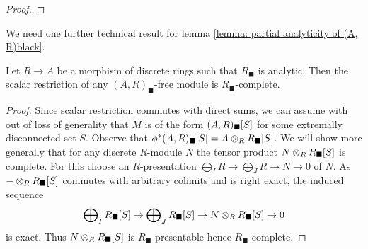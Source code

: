 \begin{proof}
\end{proof}

We need one further technical result for lemma \ref{lemma: partial analyticity of (A, R)black}.
\begin{lemma}
	\label{lemma: relative completeness}
	
	
	Let $R\to A$ be a morphism of discrete rings such that $R_\blacksquare$ is analytic. Then the scalar restriction of any $(A, R)_\blacksquare$-free module is $R_\blacksquare$-complete.
\end{lemma}
\begin{proof}
	Since scalar restriction commutes with direct sums, we can assume with out of loss of generality that $M$ is of the form ${(A, R)_\blacksquare[S]}$ for some extremally disconnected set $S$. Observe that ${\phi^\ast}{(A, R)_\blacksquare[S]} = A\otimes_R {R_\blacksquare[S]}$. We will show more generally that for any discrete $R$-module $N$ the tensor product $N\otimes_R {R_\blacksquare[S]}$ is complete. For this choose an $R$-presentation $\bigoplus_I R \to \bigoplus_J R\to N \to 0$ of $N$. As $-\otimes_R {R_\blacksquare[S]}$ commutes with arbitrary colimits and is right exact, the induced sequence
		$$\bigoplus\nolimits_I {R_\blacksquare[S]} \to \bigoplus\nolimits_J {R_\blacksquare[S]}\to N \otimes_R {R_\blacksquare[S]} \to 0$$
	is exact. Thus $N\otimes_R {R_\blacksquare[S]}$ is $R_\blacksquare$-presentable hence $R_\blacksquare$-complete.
\end{proof}


